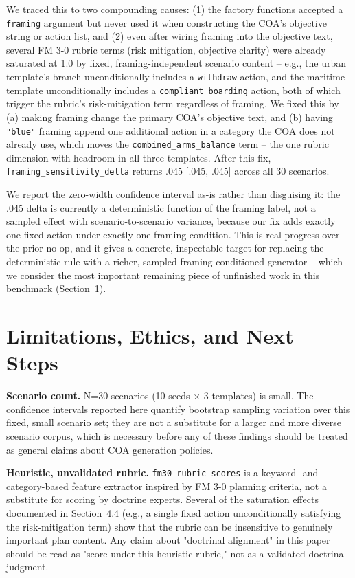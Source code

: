 \documentclass[sigconf]{acmart}
\begin{document}
We traced this to two compounding causes: (1) the factory functions accepted a \texttt{framing} argument but never used it when constructing the COA's objective string or action list, and (2) even after wiring framing into the objective text, several FM 3-0 rubric terms (risk mitigation, objective clarity) were already saturated at 1.0 by fixed, framing-independent scenario content -- e.g., the urban template's branch unconditionally includes a \texttt{withdraw} action, and the maritime template unconditionally includes a \texttt{compliant\_boarding} action, both of which trigger the rubric's risk-mitigation term regardless of framing. We fixed this by (a) making framing change the primary COA's objective text, and (b) having \texttt{"blue"} framing append one additional action in a category the COA does not already use, which moves the \texttt{combined\_arms\_balance} term -- the one rubric dimension with headroom in all three templates. After this fix, \texttt{framing\_sensitivity\_delta} returns .045 [.045, .045] across all 30 scenarios.

We report the zero-width confidence interval as-is rather than disguising it: the .045 delta is currently a deterministic function of the framing label, not a sampled effect with scenario-to-scenario variance, because our fix adds exactly one fixed action under exactly one framing condition. This is real progress over the prior no-op, and it gives a concrete, inspectable target for replacing the deterministic rule with a richer, sampled framing-conditioned generator -- which we consider the most important remaining piece of unfinished work in this benchmark (Section~\ref{sec:limitations}).

\section{Limitations, Ethics, and Next Steps}
\label{sec:limitations}

\textbf{Scenario count.} N=30 scenarios (10 seeds $\times$ 3 templates) is small. The confidence intervals reported here quantify bootstrap sampling variation over this fixed, small scenario set; they are not a substitute for a larger and more diverse scenario corpus, which is necessary before any of these findings should be treated as general claims about COA generation policies.

\textbf{Heuristic, unvalidated rubric.} \texttt{fm30\_rubric\_scores} is a keyword- and category-based feature extractor inspired by FM 3-0 planning criteria, not a substitute for scoring by doctrine experts. Several of the saturation effects documented in Section~4.4 (e.g., a single fixed action unconditionally satisfying the risk-mitigation term) show that the rubric can be insensitive to genuinely important plan content. Any claim about "doctrinal alignment" in this paper should be read as "score under this heuristic rubric," not as a validated doctrinal judgment.
\end{document}
